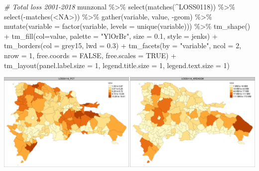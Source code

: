 \documentclass[10pt,landscape,a3paper]{article}
\newenvironment{Shaded}{\begin{snugshade}}{\end{snugshade}}
\newcommand{\AttributeTok}[1]{\textcolor[rgb]{0.77,0.63,0.00}{#1}}
\newcommand{\CommentTok}[1]{\textcolor[rgb]{0.56,0.35,0.01}{\textit{#1}}}
\newcommand{\ConstantTok}[1]{\textcolor[rgb]{0.00,0.00,0.00}{#1}}
\newcommand{\DecValTok}[1]{\textcolor[rgb]{0.00,0.00,0.81}{#1}}
\newcommand{\FloatTok}[1]{\textcolor[rgb]{0.00,0.00,0.81}{#1}}
\newcommand{\FunctionTok}[1]{\textcolor[rgb]{0.00,0.00,0.00}{#1}}
\newcommand{\NormalTok}[1]{#1}
\newcommand{\SpecialCharTok}[1]{\textcolor[rgb]{0.00,0.00,0.00}{#1}}
\newcommand{\StringTok}[1]{\textcolor[rgb]{0.31,0.60,0.02}{#1}}
\begin{document}
\begin{Shaded}
\begin{Highlighting}[]

\CommentTok{\# Total loss 2001{-}2018}
\NormalTok{munzonal }\SpecialCharTok{\%\textgreater{}\%} \FunctionTok{select}\NormalTok{(}\FunctionTok{matches}\NormalTok{(}\StringTok{\textquotesingle{}\^{}LOSS0118\textquotesingle{}}\NormalTok{)) }\SpecialCharTok{\%\textgreater{}\%} \FunctionTok{select}\NormalTok{(}\SpecialCharTok{{-}}\FunctionTok{matches}\NormalTok{(}\StringTok{\textquotesingle{}\textless{}NA\textgreater{}\textquotesingle{}}\NormalTok{)) }\SpecialCharTok{\%\textgreater{}\%} 
  \FunctionTok{gather}\NormalTok{(variable, value, }\SpecialCharTok{{-}}\NormalTok{geom) }\SpecialCharTok{\%\textgreater{}\%}
  \FunctionTok{mutate}\NormalTok{(}\AttributeTok{variable =} \FunctionTok{factor}\NormalTok{(variable, }\AttributeTok{levels =} \FunctionTok{unique}\NormalTok{(variable))) }\SpecialCharTok{\%\textgreater{}\%} 
  \FunctionTok{tm\_shape}\NormalTok{() }\SpecialCharTok{+}
  \FunctionTok{tm\_fill}\NormalTok{(}\AttributeTok{col=}\StringTok{\textquotesingle{}value\textquotesingle{}}\NormalTok{, }\AttributeTok{palette =} \StringTok{"YlOrBr"}\NormalTok{, }\AttributeTok{size =} \FloatTok{0.1}\NormalTok{, }\AttributeTok{style =} \StringTok{\textquotesingle{}jenks\textquotesingle{}}\NormalTok{) }\SpecialCharTok{+}
  \FunctionTok{tm\_borders}\NormalTok{(}\AttributeTok{col =} \StringTok{\textquotesingle{}grey15\textquotesingle{}}\NormalTok{, }\AttributeTok{lwd =} \FloatTok{0.3}\NormalTok{) }\SpecialCharTok{+}
  \FunctionTok{tm\_facets}\NormalTok{(}\AttributeTok{by =} \StringTok{"variable"}\NormalTok{, }\AttributeTok{ncol =} \DecValTok{2}\NormalTok{, }\AttributeTok{nrow =} \DecValTok{1}\NormalTok{, }\AttributeTok{free.coords =} \ConstantTok{FALSE}\NormalTok{, }\AttributeTok{free.scales =} \ConstantTok{TRUE}\NormalTok{) }\SpecialCharTok{+}
  \FunctionTok{tm\_layout}\NormalTok{(}\AttributeTok{panel.label.size =} \DecValTok{1}\NormalTok{, }\AttributeTok{legend.title.size =} \DecValTok{1}\NormalTok{, }\AttributeTok{legend.text.size =} \DecValTok{1}\NormalTok{)}
\end{Highlighting}
\end{Shaded}

\begin{center}\includegraphics{img/zonal-mun-4} \end{center}
\end{document}
